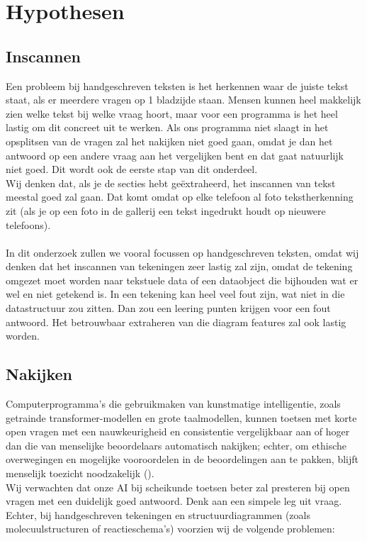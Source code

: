\documentclass[12pt]{article}
\begin{document}
\section{Hypothesen}
\begin{multicols}{2}
\noindent\begin{minipage}{\linewidth}
\subsection{Inscannen}
Een probleem bij handgeschreven teksten is het herkennen waar de juiste tekst staat, als er meerdere vragen op 1 bladzijde staan. Mensen kunnen heel makkelijk zien welke tekst bij welke vraag hoort, maar voor een programma is het heel lastig om dit concreet uit te werken. Als ons programma niet slaagt in het opsplitsen van de vragen zal het nakijken niet goed gaan, omdat je dan het antwoord op een andere vraag aan het vergelijken bent en dat gaat natuurlijk niet goed. Dit wordt ook de eerste stap van dit onderdeel.\\
Wij denken dat, als je de secties hebt geëxtraheerd, het inscannen van tekst meestal goed zal gaan. Dat komt omdat op elke telefoon al foto tekstherkenning zit (als je op een foto in de gallerij een tekst ingedrukt houdt op nieuwere telefoons). 
\\\\
In dit onderzoek zullen we vooral focussen op handgeschreven teksten, omdat wij denken dat het inscannen van tekeningen zeer lastig zal zijn, omdat de tekening omgezet moet worden naar tekstuele data of een dataobject die bijhouden wat er wel en niet getekend is. In een tekening kan heel veel fout zijn, wat niet in die datastructuur zou zitten. Dan zou een leering punten krijgen voor een fout antwoord. Het betrouwbaar extraheren van die diagram features zal ook lastig worden.
\end{minipage}

\noindent\begin{minipage}{\linewidth}
\subsection{Nakijken}
Computerprogramma's die gebruikmaken van kunstmatige intelligentie, zoals getrainde transformer-modellen en grote taalmodellen, kunnen toetsen met korte open vragen met een nauwkeurigheid en consistentie vergelijkbaar aan of hoger dan die van menselijke beoordelaars automatisch nakijken; echter, om ethische overwegingen en mogelijke vooroordelen in de beoordelingen aan te pakken, blijft menselijk toezicht noodzakelijk (\cite{gobrecht2024humansubjectivityerrornovel, kumar2020scoredusingautosas, schneider2024llmbasedautogradingshorttextual}).
\\
Wij verwachten dat onze AI bij scheikunde toetsen beter zal presteren bij open vragen met een duidelijk goed antwoord. Denk aan een simpele leg uit vraag.
Echter, bij handgeschreven tekeningen en structuurdiagrammen (zoals molecuulstructuren of reactieschema's) voorzien wij de volgende problemen: 
    

\end{minipage}
\end{multicols}
\end{document}

